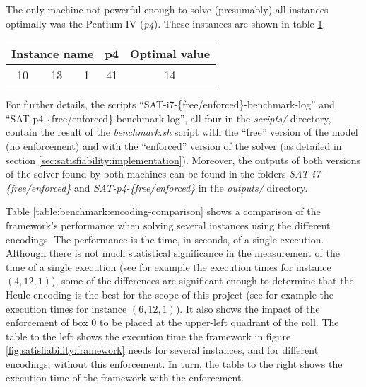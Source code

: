 The only machine not powerful enough to solve (presumably) all instances optimally
was the Pentium IV (\textit{p4}). These instances are shown in table
\ref{table:benchmark:SAT-results:suboptimalinstances}.

\begin{table}[H]
\centering
	\begin{tabular}{ccccc}
		\multicolumn{3}{c}{Instance name}
					& p4		& Optimal value \\
		\midrule
		10 & 13 & 1	& 41		& 14 \\
	\end{tabular}
	\label{table:benchmark:SAT-results:suboptimalinstances}
\end{table}

For further details, the scripts ``SAT-i7-\{free/enforced\}-benchmark-log''
and ``SAT-p4-\{free/enforced\}-benchmark-log'', all four in the \textit{scripts/}
directory, contain the result of the \textit{benchmark.sh} script with the ``free''
version of the model (no enforcement) and with the ``enforced'' version of the solver
(as detailed in section \ref{sec:satisfiability:implementation}). Moreover, the
outputs of both versions of the solver found by both machines can be found in the
folders \textit{SAT-i7-\{free/enforced\}} and \textit{SAT-p4-\{free/enforced\}}
in the \textit{outputs/} directory.

\hfill

Table \ref{table:benchmark:encoding-comparison} shows a comparison of the framework's
performance when solving several instances using the different encodings. The performance
is the time, in seconds, of a single execution. Although there is not much statistical
significance in the measurement of the time of a single execution (see for example the
execution times for instance $(4,12,1)$), some of the differences
are significant enough to determine that the Heule encoding is the best for the scope
of this project (see for example the execution times for instance $(6,12,1)$).
It also shows the impact of the enforcement of box 0 to be
placed at the upper-left quadrant of the roll. The table to the left shows the execution time
the framework in figure \ref{fig:satisfiability:framework} needs for several instances,
and for different encodings, without this enforcement. In turn, the table to the right
shows the execution time of the framework with the enforcement.

